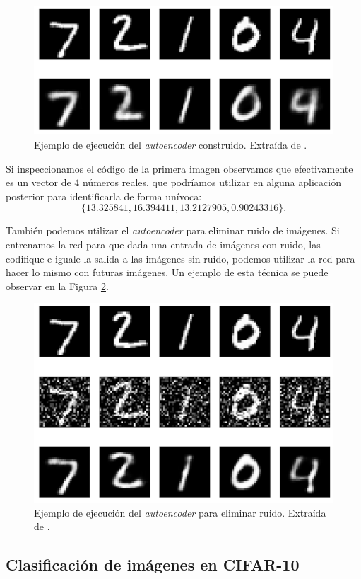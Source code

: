 \documentclass[
  a4paper,
  12pt,
  spanish,
]{scrartcl}
\theoremstyle{teorema-style}
\begin{document}
\begin{figure}[h]
  \centering
  \includegraphics[width=.7\textwidth]{img/autoencoder_ex1}
  \caption{Ejemplo de ejecución del \textit{autoencoder} construido. Extraída de \parencite{arden_autoencoder_2017}.}
  \label{fig:autoencoder_ex1}
\end{figure}

Si inspeccionamos el código de la primera imagen observamos que efectivamente es un vector de 4 números reales, que podríamos utilizar en alguna aplicación posterior para identificarla de forma unívoca:
$$\{13.325841  , 16.394411  , 13.2127905 ,  0.90243316\}.$$

También podemos utilizar el \textit{autoencoder} para eliminar ruido de
imágenes. Si entrenamos la red para que dada una entrada de imágenes con ruido, las codifique e iguale la salida a las imágenes sin ruido, podemos utilizar la red para hacer lo mismo con futuras imágenes. Un ejemplo de esta técnica se puede observar en la Figura \ref{fig:autoencoder_ex2}.

\begin{figure}[h]
  \centering
  \includegraphics[width=.7\textwidth]{img/autoencoder_ex2}
  \caption{Ejemplo de ejecución del \textit{autoencoder} para eliminar ruido. Extraída de \parencite{arden_autoencoder_2017}.}
  \label{fig:autoencoder_ex2}
\end{figure}

\subsection{Clasificación de imágenes en CIFAR-10}
\end{document}
